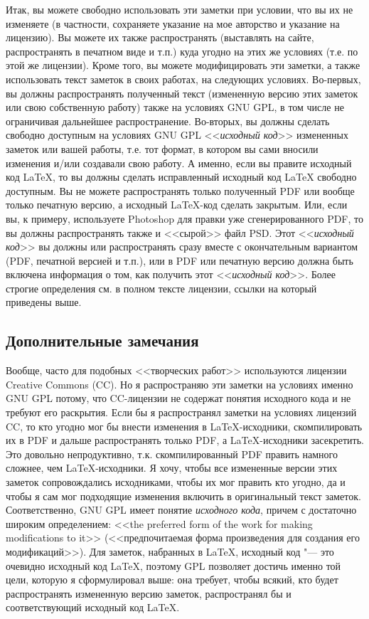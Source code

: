 Итак, вы можете свободно использовать эти заметки при условии, что вы их не изменяете (в частности, сохраняете указание на мое авторство и указание на лицензию). Вы можете их также распространять (выставлять на сайте, распространять в печатном виде и т.п.) куда угодно на этих же условиях (т.е. по этой же лицензии). Кроме того, вы можете модифицировать эти заметки, а также использовать текст заметок в своих работах, на следующих условиях. Во-первых, вы должны распространять полученный текст (измененную версию этих заметок или свою собственную работу) также на условиях GNU GPL, в том числе не ограничивая дальнейшее распространение. Во-вторых, вы должны сделать свободно доступным на условиях GNU GPL <<\textit{исходный код}>> измененных заметок или вашей работы, т.е. тот формат, в котором вы сами вносили изменения и/или создавали свою работу. А именно, если вы правите исходный код \LaTeX, то вы должны сделать исправленный исходный код \LaTeX{} свободно доступным. Вы не можете распространять только полученный PDF или вообще только печатную версию, а исходный \LaTeX-код сделать закрытым. Или, если вы, к примеру, используете Photoshop для правки уже сгенерированного PDF, то вы должны распространять также и <<сырой>> файл PSD. Этот <<\textit{исходный код}>> вы должны или распространять сразу вместе с окончательным вариантом (PDF, печатной версией и т.п.), или в PDF или печатную версию должна быть включена информация о том, как получить этот <<\textit{исходный код}>>. Более строгие определения см. в полном тексте лицензии, ссылки на который приведены выше.

\subsection*{Дополнительные замечания}
\small

Вообще, часто для подобных <<творческих работ>> используются лицензии Creative Commons (CC). Но я распространяю эти заметки на условиях именно GNU GPL потому, что CC-лицензии не содержат понятия исходного кода и не требуют его раскрытия. Если бы я распространял заметки на условиях лицензий CC, то кто угодно мог бы внести изменения в \LaTeX-исходники, скомпилировать их в PDF и дальше распространять только PDF, а \LaTeX-исходники засекретить. Это довольно непродуктивно, т.к. скомпилированный PDF править намного сложнее, чем \LaTeX-исходники. Я хочу, чтобы все измененные версии этих заметок сопровождались исходниками, чтобы их мог править кто угодно, да и чтобы я сам мог подходящие изменения включить в оригинальный текст заметок. Соответственно, GNU GPL имеет понятие \textit{исходного кода}, причем с достаточно широким определением: <<the preferred form of the work for making modifications to it>> (<<предпочитаемая форма произведения для создания его модификаций>>). Для заметок, набранных в \LaTeX, исходный код "--- это очевидно исходный код \LaTeX, поэтому GPL позволяет достичь именно той цели, которую я сформулировал выше: она требует, чтобы всякий, кто будет распространять измененную версию заметок, распространял бы и соответствующий исходный код \LaTeX.

